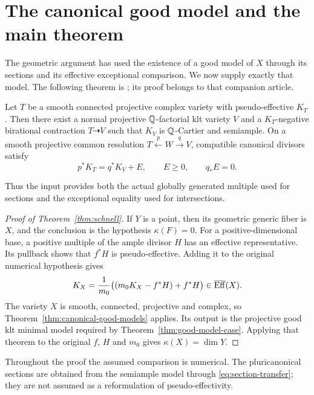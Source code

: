 \section{The canonical good model and the main theorem}
\label{sec:good-model-interface}

The geometric argument has used the existence of a good model of
$X$ through its sections and its effective exceptional comparison.
We now supply exactly that model. The following theorem is
\cite[Corollary~11.2]{LogAbundance2026}; its proof belongs to that
companion article.

\begin{theorem}
\label{thm:canonical-good-models}
Let $T$ be a smooth connected projective complex variety with
pseudo-effective $K_T$. Then there exist a normal projective
$\mathbb Q$-factorial klt variety $V$ and a $K_T$-negative birational
contraction $T\dashrightarrow V$ such that $K_V$ is $\mathbb Q$-Cartier
and semiample. On a smooth projective common resolution
$T\xleftarrow{p}W\xrightarrow{q}V$, compatible canonical divisors
satisfy
\[
 p^*K_T=q^*K_V+E,\qquad E\geq0,\qquad q_*E=0.
\]
\end{theorem}

Thus the input provides both the actual globally generated multiple
used for sections and the exceptional equality used for intersections.

\begin{proof}[Proof of Theorem~\ref{thm:schnell}]
If $Y$ is a point, then its geometric generic fiber is $X$, and
the conclusion is the hypothesis $\kappa(F)=0$.
For a positive-dimensional base, a positive multiple of the ample
divisor $H$ has an effective representative. Its pullback shows that $f^*H$ is
pseudo-effective. Adding it to the original numerical hypothesis gives
\[
 K_X=\frac1{m_0}\bigl((m_0K_X-f^*H)+f^*H\bigr)\in\overline{\operatorname{Eff}}(X).
\]
The variety $X$ is smooth, connected, projective and complex, so
Theorem~\ref{thm:canonical-good-models} applies. Its output is the
projective good klt minimal model required by
Theorem~\ref{thm:good-model-case}. Applying that theorem to the
original $f$, $H$ and $m_0$ gives $\kappa(X)=\dim Y$.
\end{proof}

Throughout the proof the assumed comparison is numerical. The
pluricanonical sections are obtained from the semiample model through
\eqref{eq:section-transfer}; they are not assumed as a reformulation
of pseudo-effectivity.

